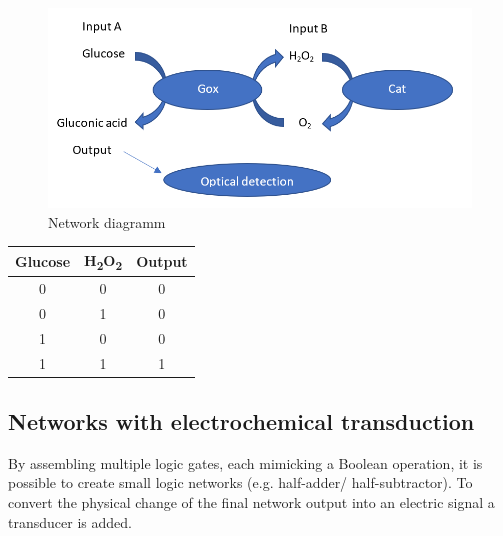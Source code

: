\documentclass[runningheads]{llncs}
\begin{document}
		\begin{figure}[H] \centering \includegraphics[scale= 0.34]{pics/ANDneu.png} \caption{Network diagramm} \label{img:and} \end{figure}
		
		\begin{center}
		\begin{tabular}{c|c|c}
			Glucose & H\textsubscript{2}O\textsubscript{2} & Output\\\hline
			0 & 0 & 0\\ 
			0 & 1 & 0\\
			1 & 0 & 0\\
			1 & 1 & 1
		\end{tabular}
		\end{center}
	
\subsection{Networks with electrochemical transduction}

		By assembling multiple logic gates, each mimicking a Boolean operation, it is possible to create small logic networks (e.g. half-adder/ half-subtractor). To convert the physical change of the final network output into an electric signal a transducer is added.
	
\end{document}
